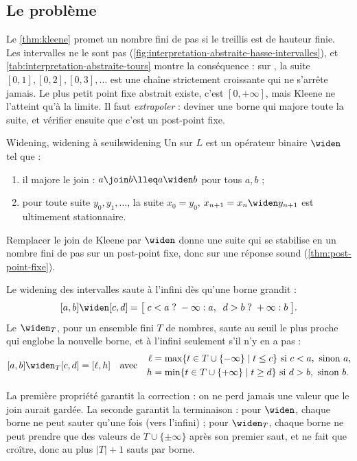 \subsection{Le problème}

Le \cref{thm:kleene} promet un nombre fini de pas si le treillis est de
hauteur finie. Les intervalles ne le sont pas
(\cref{fig:interpretation-abstraite-hasse-intervalles}), et
\cref{tab:interpretation-abstraite-tours} montre la conséquence : sur
, la suite $[0,1], [0,2], [0,3], \dots$ est une chaîne
strictement croissante qui ne s'arrête jamais. Le plus petit point fixe
abstrait existe, c'est $[0,+\infty]$, mais Kleene ne l'atteint qu'à la
limite. Il faut \emph{extrapoler} : deviner une borne qui majore toute la
suite, et vérifier ensuite que c'est un post-point fixe.

\begin{definition}{Widening, widening à seuils}{widening}
  Un  sur $L$ est un opérateur binaire $\widen$ tel que :
  \begin{enumerate}
    \item il majore le join : $a \join b \lleq a \widen b$ pour tous $a, b$ ;
    \item pour toute suite $y_0, y_1, \dots$, la suite
      $x_0 = y_0$, $x_{n+1} = x_n \widen y_{n+1}$ est ultimement stationnaire.
  \end{enumerate}
  Remplacer le join de Kleene par $\widen$ donne une suite qui se stabilise en
  un nombre fini de pas sur un post-point fixe, donc sur une réponse sound
  (\cref{thm:post-point-fixe}).

  Le widening des intervalles saute à l'infini dès qu'une borne grandit :
  \[ [a,b] \widen [c,d] = \big[\; c < a \;?\; -\infty : a,\;\; d > b \;?\; +\infty : b \;\big]. \]
  Le  $\widen_T$, pour un ensemble fini $T$ de
  nombres, saute au seuil le plus proche qui englobe la nouvelle borne, et à
  l'infini seulement s'il n'y en a pas :
  \[ [a,b] \widen_T [c,d] = [\ell, h] \quad\text{avec}\quad
     \begin{aligned}
       \ell &= \max\{t \in T \cup \{-\infty\} \mid t \le c\} \text{ si } c < a, \text{ sinon } a,\\
       h &= \min\{t \in T \cup \{+\infty\} \mid t \ge d\} \text{ si } d > b, \text{ sinon } b.
     \end{aligned} \]
\end{definition}

La première propriété garantit la correction : on ne perd jamais une valeur
que le join aurait gardée. La seconde garantit la terminaison : pour
$\widen$, chaque borne ne peut sauter qu'une fois (vers l'infini) ; pour
$\widen_T$, chaque borne ne peut prendre que des valeurs de $T \cup
\{\pm\infty\}$ après son premier saut, et ne fait que croître, donc au plus
$|T| + 1$ sauts par borne.

